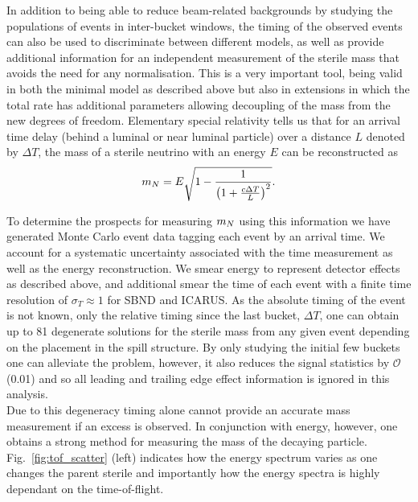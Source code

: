 \documentclass[11pt, a4paper]{article}
\newcommand{\reffig}[1]{Fig.~\ref{#1}}
\def\ster{\ensuremath N}
\begin{document}
In addition to being able to reduce beam-related backgrounds by studying the
populations of events in inter-bucket windows, the timing of the observed
events can also be used to discriminate between different models, as well as
provide additional information for an independent measurement of the sterile
mass that avoids the need for any normalisation. This is a very important tool,
being valid in both the minimal model as described above but also in extensions
in which the total rate has additional parameters allowing decoupling of the
mass from the new degrees of freedom.  Elementary special relativity tells us
that for an arrival time delay (behind a luminal or near luminal particle) over
a distance $L$ denoted by $\Delta T$, the mass of a sterile neutrino with an
energy $E$ can be reconstructed as 
%
\[ m_{\ster} = E\sqrt{1-\frac{1}{\left(1+\frac{c\Delta T}{L}\right)^2}}. \]

To determine the prospects for measuring $m_{\ster}$ using this information we
have generated Monte Carlo event data tagging each event by an arrival time.
We account for a systematic uncertainty associated with the time measurement as
well as the energy reconstruction. We smear energy to represent detector
effects as described above, and additional smear the time of each event with a
finite time resolution of $\sigma_T  \approx 1$ for SBND and ICARUS. As the
absolute timing of the event is not known, only the relative timing since the
last bucket, $\Delta T$, one can obtain up to 81 degenerate solutions for the
sterile mass from any given event depending on the placement in the spill
structure. By only studying the initial few buckets one can alleviate the
problem, however, it also reduces the signal statistics by $\mathcal{O}$(0.01)
and so all leading and trailing edge effect information is ignored in this analysis. \\

Due to this degeneracy timing alone cannot provide an accurate mass measurement
if an excess is observed. In conjunction with energy, however, one obtains a
strong method for measuring the mass of the decaying particle.
\reffig{fig:tof_scatter} (left) indicates how the energy spectrum varies as one
changes the parent sterile and importantly how the energy spectra is highly
dependant on the time-of-flight. 
\end{document}
